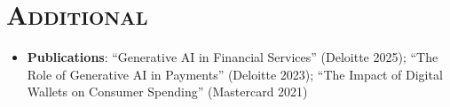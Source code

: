 \documentclass[11pt,a4paper]{moderncv}
\begin{document}
\section{\textsc{Additional}}
\begin{itemize}
\item[\textbullet] \textbf{Publications}: ``Generative AI in Financial Services'' (Deloitte 2025); ``The Role of Generative AI in Payments'' (Deloitte 2023); ``The Impact of Digital Wallets on Consumer Spending'' (Mastercard 2021)
\end{itemize}
\vspace{-2pt}
\end{document}
